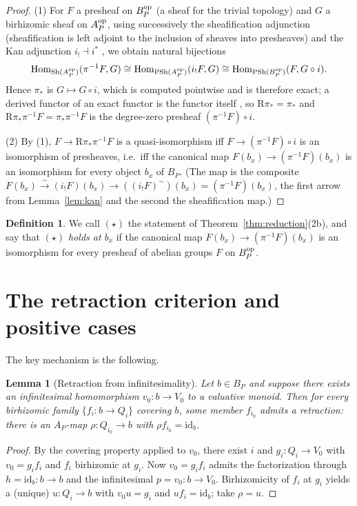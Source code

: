 \documentclass[11pt]{amsart}
\theoremstyle{plain}
\newtheorem{lemma}[theorem]{Lemma}
\theoremstyle{remark}
\theoremstyle{definition}
\newtheorem{definition}[theorem]{Definition}
\numberwithin{equation}{section}
\begin{document}
\begin{proof}
(1) For $F$ a presheaf on $B_P^{\rm op}$ (a sheaf for the trivial
topology) and $G$ a birhizomic sheaf on $A_P^{\rm op}$, using successively
the sheafification adjunction (sheafification is left adjoint to the
inclusion of sheaves into presheaves) and the Kan adjunction
$i_!\dashv i^*$ \cite{MM}, we obtain natural bijections
\[
\operatorname{Hom}_{\operatorname{Sh}(A_P^{\rm op})}(\pi^{-1}F,G)
\cong\operatorname{Hom}_{\operatorname{PSh}(A_P^{\rm op})}(i_!F,G)
\cong\operatorname{Hom}_{\operatorname{PSh}(B_P^{\rm op})}(F,G\circ i).
\]
Hence $\pi_*$ is $G\mapsto G\circ i$, which is computed pointwise and is
therefore exact; a derived functor of an exact functor is the functor
itself \cite[Ch.~II]{SGA4}, so $\mathrm R\pi_*=\pi_*$ and
$\mathrm R\pi_*\pi^{-1}F=\pi_*\pi^{-1}F$ is the degree-zero presheaf
$(\pi^{-1}F)\circ i$.

(2) By (1), $F\to\mathrm R\pi_*\pi^{-1}F$ is a quasi-isomorphism iff
$F\to(\pi^{-1}F)\circ i$ is an isomorphism of presheaves, i.e.\ iff the
canonical map $F(b_x)\to(\pi^{-1}F)(b_x)$ is an isomorphism for every
object $b_x$ of $B_P$.  (The map is the composite
$F(b_x)\xrightarrow{\sim}(i_!F)(b_x)\to((i_!F)^{\sim})(b_x)
=(\pi^{-1}F)(b_x)$, the first arrow from Lemma~\ref{lem:kan} and the
second the sheafification map.)
\end{proof}

\begin{definition}\label{def:star}
We call $(\star)$ the statement of Theorem~\ref{thm:reduction}(2b), and
say that \emph{$(\star)$ holds at $b_x$} if the canonical map
$F(b_x)\to(\pi^{-1}F)(b_x)$ is an isomorphism for every presheaf of
abelian groups $F$ on $B_P^{\rm op}$.
\end{definition}

\section{The retraction criterion and positive cases}

The key mechanism is the following.

\begin{lemma}[Retraction from infinitesimality]\label{lem:retraction}
Let $b\in B_P$ and suppose there exists an infinitesimal homomorphism
$v_0\colon b\to V_0$ to a valuative monoid.  Then for every birhizomic
family $\{f_i\colon b\to Q_i\}$ covering $b$, some member $f_{i_0}$
admits a retraction: there is an $A_P$-map $\rho\colon Q_{i_0}\to b$ with
$\rho f_{i_0}=\mathrm{id}_b$.
\end{lemma}
\begin{proof}
By the covering property applied to $v_0$, there exist $i$ and
$g_i\colon Q_i\to V_0$ with $v_0=g_if_i$ and $f_i$ birhizomic at $g_i$.
Now $v_0=g_if_i$ admits the factorization through
$h=\mathrm{id}_b\colon b\to b$ and the infinitesimal $p=v_0\colon b\to
V_0$.  Birhizomicity of $f_i$ at $g_i$ yields a (unique) $u\colon Q_i\to
b$ with $v_0u=g_i$ and $uf_i=\mathrm{id}_b$; take $\rho=u$.
\end{proof}
\end{document}
